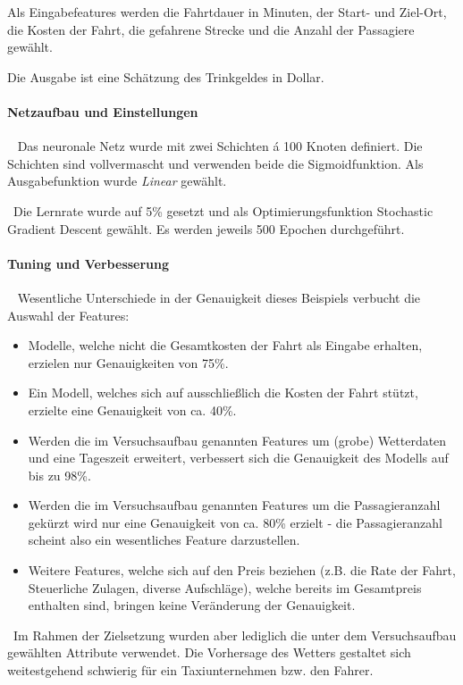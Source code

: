 Als Eingabefeatures werden die Fahrtdauer in Minuten, der Start- und Ziel-Ort, die Kosten der Fahrt, die gefahrene Strecke und die Anzahl der Passagiere gewählt. 

Die Ausgabe ist eine Schätzung des Trinkgeldes in Dollar.
\paragraph{Netzaufbau und Einstellungen} ~\newline
Das neuronale Netz wurde mit zwei Schichten á 100 Knoten definiert. Die Schichten sind vollvermascht und verwenden beide die Sigmoidfunktion. Als Ausgabefunktion wurde \textit{Linear} gewählt.

~\newline Die Lernrate wurde auf 5\% gesetzt und als Optimierungsfunktion Stochastic Gradient Descent gewählt. Es werden jeweils 500 Epochen durchgeführt. 
\paragraph{Tuning und Verbesserung} ~\newline
Wesentliche Unterschiede in der Genauigkeit dieses Beispiels verbucht die Auswahl der Features:
\begin{itemize}
	\item Modelle, welche nicht die Gesamtkosten der Fahrt als Eingabe erhalten, erzielen nur Genauigkeiten von 75\%.
	\item Ein Modell, welches sich auf ausschließlich die Kosten der Fahrt stützt, erzielte eine Genauigkeit von ca. 40\%. 
	\item Werden die im Versuchsaufbau genannten Features um (grobe) Wetterdaten und eine Tageszeit erweitert, verbessert sich die Genauigkeit des Modells auf bis zu 98\%. 
	\item Werden die im Versuchsaufbau genannten Features um die Passagieranzahl gekürzt wird nur eine Genauigkeit von ca. 80\% erzielt - die Passagieranzahl scheint also ein wesentliches Feature darzustellen.
	\item Weitere Features, welche sich auf den Preis beziehen (z.B. die Rate der Fahrt, Steuerliche Zulagen, diverse Aufschläge), welche bereits im Gesamtpreis enthalten sind, bringen keine Veränderung der Genauigkeit. 
\end{itemize} 
~\newline Im Rahmen der Zielsetzung wurden aber lediglich die unter dem Versuchsaufbau gewählten Attribute verwendet. Die Vorhersage des Wetters gestaltet sich weitestgehend schwierig für ein Taxiunternehmen bzw. den Fahrer. 

